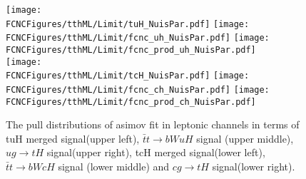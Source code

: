 \begin{figure}[H]
\centering
\texttt{[image: \\FCNCFigures/tthML/Limit/tuH\_NuisPar.pdf]}
\texttt{[image: \\FCNCFigures/tthML/Limit/fcnc\_uh\_NuisPar.pdf]}
\texttt{[image: \\FCNCFigures/tthML/Limit/fcnc\_prod\_uh\_NuisPar.pdf]}
\\
\texttt{[image: \\FCNCFigures/tthML/Limit/tcH\_NuisPar.pdf]}
\texttt{[image: \\FCNCFigures/tthML/Limit/fcnc\_ch\_NuisPar.pdf]}
\texttt{[image: \\FCNCFigures/tthML/Limit/fcnc\_prod\_ch\_NuisPar.pdf]}
\caption{The pull distributions of asimov fit in leptonic channels in terms of tuH merged signal(upper left), $\bar{t}t\to bWuH$ signal (upper middle), $ug\to tH$ signal(upper right), tcH merged signal(lower left), $\bar{t}t\to bWcH$ signal (lower middle) and $cg\to tH$ signal(lower right). }
\label{fig:fcnc_tthml_NuisPar}
\end{figure}



%
%
%
%
%







